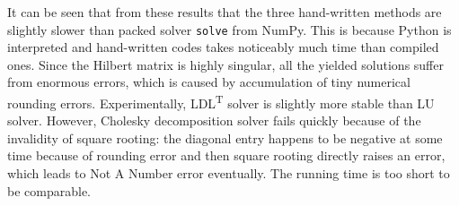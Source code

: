 \documentclass[english, nochinese]{pnote}
\begin{document}
It can be seen that from these results that the three hand-written methods are slightly slower than packed solver \verb"solve" from NumPy. This is because Python is interpreted and hand-written codes takes noticeably much time than compiled ones. Since the Hilbert matrix is highly singular, all the yielded solutions suffer from enormous errors, which is caused by accumulation of tiny numerical rounding errors. Experimentally, LDL\textsuperscript{T} solver is slightly more stable than LU solver. However, Cholesky decomposition solver fails quickly because of the invalidity of square rooting: the diagonal entry happens to be negative at some time because of rounding error and then square rooting directly raises an error, which leads to Not A Number error eventually. The running time is too short to be comparable.
\end{document}
